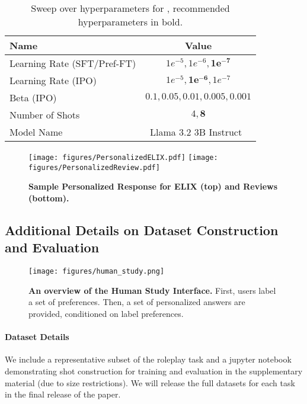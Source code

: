 \begin{table*}
    \centering
    \renewcommand{\arraystretch}{1.2} %
    \setlength{\tabcolsep}{8pt} %
    \begin{tabular}{l c}
        \toprule
        \textbf{Name} & \textbf{Value} \\
        \midrule
        Learning Rate (SFT/Pref-FT) & \(1e^{-5}, 1e^{-6}, \mathbf{1e^{-7}}\) \\
        Learning Rate (IPO) & \(1e^{-5}, \mathbf{1e^{-6}}, 1e^{-7}\) \\
        Beta (IPO) & \(0.1, 0.05, 0.01, \mathbf{0.005}, 0.001\) \\
        Number of Shots & \(4, \mathbf{8}\) \\
        Model Name & Llama 3.2 3B Instruct~\citep{grattafiori2024llama} \\
        \bottomrule
    \end{tabular}
    \caption{Sweep over hyperparameters for \methodname, recommended hyperparameters in bold.}
    \label{tab:hyperparameters}
\end{table*}

\begin{figure*}
    \centering
    \texttt{[image: figures/PersonalizedELIX.pdf]}
    \texttt{[image: figures/PersonalizedReview.pdf]}
    \caption{\footnotesize\textbf{Sample Personalized Response for ELIX (top) and Reviews (bottom).}}
    \label{fig:personalized_responses}
\end{figure*}


\subsection{Additional Details on Dataset Construction and Evaluation}
\label{sec:app_dataset_eval}
\begin{figure*}
    \centering
    \texttt{[image: figures/human\_study.png]}
    \caption{\footnotesize \textbf{An overview of the Human Study Interface.} First, users label a set of preferences. Then, a set of personalized answers are provided, conditioned on label preferences.}
    \vspace{-0.2cm}
    \label{fig:human_app}
    \vspace{-0.3cm}
\end{figure*}


\paragraph{Dataset Details}
We include a representative subset of the roleplay task and a jupyter notebook demonstrating shot construction for training and evaluation in the supplementary material (due to size restrictions). We will release the full datasets for each task in the final release of the paper. 

